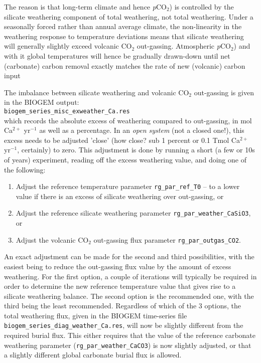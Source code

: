 \documentclass[11pt,fleqn]{book} %
\begin{document}
The reason is that long-term climate and hence \textit{p}CO${_2}$) is controlled by the silicate weathering component of total weathering, not total weathering. Under a seasonally forced rather than annual average climate, the non-linearity in the weathering response to temperature deviations means that silicate weathering will generally slightly exceed volcanic CO$_{2}$ out-gassing. Atmospheric \textit{p}CO${_2}$) and with it  global temperatures will hence be gradually drawn-down until net (carbonate) carbon removal exactly matches the rate of new (volcanic) carbon input

The imbalance between silicate weathering and volcanic CO$_{2}$ out-gassing is given in the BIOGEM output:
\\\texttt{biogem\_series\_misc\_exweather\_Ca.res}
\\which records the absolute excess of weathering compared to out-gassing, in mol Ca$^{2+}$ yr$^{-1}$ as well as a percentage. In an \textit{open system} (not a closed one!), this excess needs to be adjusted 'close' (how close? sub 1 percent or 0.1 Tmol Ca$^{2+}$ yr$^{-1}$, certainly) to zero. This adjustment is done by running a short (a few or 10s of years) experiment, reading off the excess weathering value, and doing one of the following:

\begin{enumerate}
\item Adjust the reference temperature parameter \texttt{rg\_par\_ref\_T0} -- to a lower value if there is an excess of silicate weathering over out-gassing, or
\item Adjust the reference silicate weathering parameter \texttt{rg\_par\_weather\_CaSiO3}, or
\item Adjust the volcanic CO$_{2}$ out-gassing flux parameter \texttt{rg\_par\_outgas\_CO2}.
\end{enumerate}
An exact adjustment can be made for the second and third possibilities, with the easiest being to reduce the out-gassing flux value by the amount of excess weathering. For the first option, a couple of iterations will typically be required in order to determine the new reference temperature value that gives rise to a silicate weathering balance. The second option is the recommended one, with the third being the least recommended.
Regardless of which of the 3 options, the total weathering flux, given in the BIOGEM time-series file \texttt{biogem\_series\_diag\_weather\_Ca.res}, will now be slightly different from the required burial flux. This either requires that the value of the reference carbonate weathering parameter (\texttt{rg\_par\_weather\_CaCO3}) is now slightly adjusted, or that a slightly different global carbonate burial flux is allowed.
\end{document}
